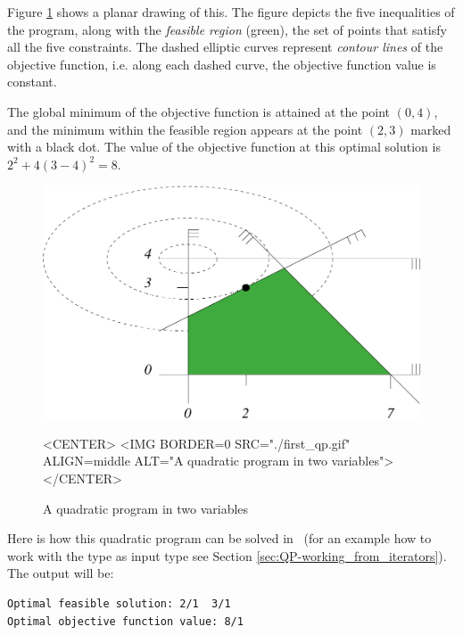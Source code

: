 Figure \ref{fig:QP-first_qp} shows a planar drawing of this. The figure
depicts the five inequalities of the program, along with the
\emph{feasible region} (green), the set of points that satisfy all the
five constraints. The dashed elliptic curves represent \emph{contour lines} 
of the objective function, i.e. along each dashed curve, the objective
function value is constant. 

The global minimum of the objective function is attained at 
the point $(0,4)$, and the minimum within the feasible region appears
at the point $(2,3)$ marked with a black dot. The value of the objective
function at this optimal solution is $2^2 + 4(3-4)^2 = 8$.

\begin{figure}[htbp]
\begin{ccTexOnly}
\begin{center}
\includegraphics{QP_solver/first_qp} %
\end{center}
\end{ccTexOnly}


\begin{ccHtmlOnly}
<CENTER>
<IMG BORDER=0 SRC="./first_qp.gif" ALIGN=middle ALT="A quadratic program in two variables">
</CENTER>
\end{ccHtmlOnly}

\caption{A quadratic program in two variables
\label{fig:QP-first_qp}}
\end{figure}

Here is how this quadratic program can be solved in \cgal\ (for an example
how to work with the type  as input type see Section 
\ref{sec:QP-working_from_iterators}).
The output will be:
\begin{verbatim}
Optimal feasible solution: 2/1  3/1
Optimal objective function value: 8/1
\end{verbatim}

